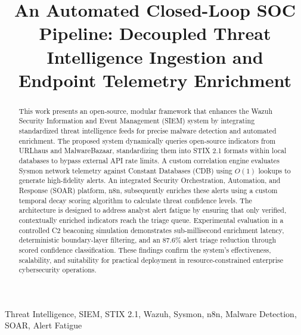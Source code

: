\documentclass[conference]{IEEEtran}
\begin{document}
\title{An Automated Closed-Loop SOC Pipeline: Decoupled Threat Intelligence Ingestion and Endpoint Telemetry Enrichment}

\author{
    \and
}


\maketitle

\begin{abstract}
This work presents an open-source, modular framework that enhances the Wazuh Security Information and Event Management (SIEM) system by integrating standardized threat intelligence feeds for precise malware detection and automated enrichment. The proposed system dynamically queries open-source indicators from URLhaus and MalwareBazaar, standardizing them into STIX 2.1 formats within local databases to bypass external API rate limits. A custom correlation engine evaluates Sysmon network telemetry against Constant Databases (CDB) using $O(1)$ lookups to generate high-fidelity alerts. An integrated Security Orchestration, Automation, and Response (SOAR) platform, n8n, subsequently enriches these alerts using a custom temporal decay scoring algorithm to calculate threat confidence levels. The architecture is designed to address analyst alert fatigue by ensuring that only verified, contextually enriched indicators reach the triage queue. Experimental evaluation in a controlled C2 beaconing simulation demonstrates sub-millisecond enrichment latency, deterministic boundary-layer filtering, and an 87.6\% alert triage reduction through scored confidence classification. These findings confirm the system's effectiveness, scalability, and suitability for practical deployment in resource-constrained enterprise cybersecurity operations.
\end{abstract}

\begin{IEEEkeywords}
Threat Intelligence, SIEM, STIX 2.1, Wazuh, Sysmon, n8n, Malware Detection, SOAR, Alert Fatigue
\end{IEEEkeywords}
\end{document}
